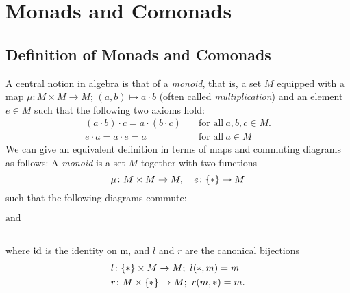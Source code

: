 \chapter{Monads and Comonads}
\section{Definition of Monads and Comonads}
A central notion in algebra is that of a \textit{monoid},
that is, a set $M$ equipped with a map 
$\mu \colon M \times M \to M$; $(a,b) \mapsto a \cdot b$ 
(often called \textit{multiplication}) and an element $e \in M$
such that the following two axioms hold:
\begin{align}
    \label{eq: associativity for a monoid}  \tag{associativity} 
    (a \cdot b) \cdot c = a \cdot (b \cdot c) 
    \quad &\text{for all} \ a,b,c \in M. \\
    \label{eq: identity element for a monoid} \tag{identity element}
    e \cdot a = a \cdot e = a \quad &\text{for all} \ a \in M 
\end{align}
We can give an equivalent definition in terms of maps and commuting diagrams as follows:
A \textit{monoid} is a set $M$ together with two functions 
\[
    \mu \colon M \times M \to M, \quad 
    e \colon \{\ast\} \to M
\]
such that the following diagrams commute: \\

\begin{minipage}{0.4\linewidth}
    \centering
    \end{minipage}
    $\mathrm{and}$ 
    \begin{minipage}{0.4\linewidth}
    \centering
    \end{minipage} \\
    where $\operatorname{id}$ is the identity on m, and $l$ and $r$ are the canonical bijections
    \begin{align*}
        &l \colon \{\ast\} \times M \to M;\ l(\ast,m) = m \\
        &r \colon M \times \{\ast\} \to M;\ r(m,\ast) = m.
    \end{align*}

